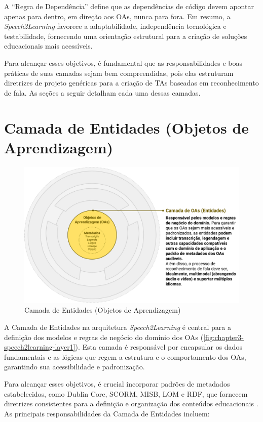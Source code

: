 A ``Regra de Dependência'' define que as dependências de código devem apontar apenas para dentro, em direção aos OAs, nunca para fora. Em resumo, a \textit{Speech2Learning} favorece a adaptabilidade, independência tecnológica e testabilidade, fornecendo uma orientação estrutural para a criação de soluções educacionais mais acessíveis. 

Para alcançar esses objetivos, é fundamental que as responsabilidades e boas práticas de suas camadas sejam bem compreendidas, pois elas estruturam diretrizes de projeto genéricas para a criação de TAs baseadas em reconhecimento de fala. As seções a seguir detalham cada uma dessas camadas.

\section{Camada de Entidades (Objetos de Aprendizagem)}

\begin{figure}[htb]
\centering
\caption{Camada de Entidades (Objetos de Aprendizagem)}
\label{fig:chapter3-speech2learning-layer1}
\includegraphics[width=1\textwidth]{images/chapter3-speech2learning-layer1.png}
\end{figure}

A Camada de Entidades na arquitetura \textit{Speech2Learning} é central para a definição dos modelos e regras de negócio do domínio dos OAs (\autoref{fig:chapter3-speech2learning-layer1}). Esta camada é responsável por encapsular os dados fundamentais e as lógicas que regem a estrutura e o comportamento dos OAs, garantindo sua acessibilidade e padronização. 

Para alcançar esses objetivos, é crucial incorporar padrões de metadados estabelecidos, como Dublin Core, SCORM, MISB, LOM e RDF, que fornecem diretrizes consistentes para a definição e organização dos conteúdos educacionais \cite{Santana2023}. As principais responsabilidades da Camada de Entidades incluem:

